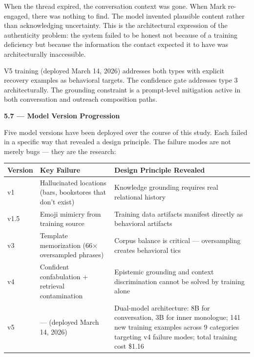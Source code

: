 When the thread expired, the conversation context was gone. When Mark
re-engaged, there was nothing to find. The model invented plausible
content rather than acknowledging uncertainty. This is the architectural
expression of the authenticity problem: the system failed to be honest
not because of a training deficiency but because the information the
contact expected it to have was architecturally inaccessible.

V5 training (deployed March 14, 2026) addresses both types with explicit
recovery examples as behavioral targets. The confidence gate addresses
type 3 architecturally. The grounding constraint is a prompt-level
mitigation active in both conversation and outreach composition paths.

\textbf{5.7 --- Model Version Progression}

Five model versions have been deployed over the course of this study.
Each failed in a specific way that revealed a design principle. The
failure modes are not merely bugs --- they are the research:

\begin{longtable}[]{@{}
  >{\raggedright\arraybackslash}p{}
  >{\raggedright\arraybackslash}p{}
  >{\raggedright\arraybackslash}p{}@{}}
\toprule\noalign{}
\begin{minipage}[b]{\linewidth}\raggedright
Version
\end{minipage} & \begin{minipage}[b]{\linewidth}\raggedright
Key Failure
\end{minipage} & \begin{minipage}[b]{\linewidth}\raggedright
Design Principle Revealed
\end{minipage} \\
\midrule\noalign{}
\endhead
\bottomrule\noalign{}
\endlastfoot
v1 & Hallucinated locations (bars, bookstores that don't exist) &
Knowledge grounding requires real relational history \\
v1.5 & Emoji mimicry from training source & Training data artifacts
manifest directly as behavioral artifacts \\
v3 & Template memorization (66× oversampled phrases) & Corpus balance is
critical --- oversampling creates behavioral tics \\
v4 & Confident confabulation + retrieval contamination & Epistemic
grounding and context discrimination cannot be solved by training
alone \\
v5 & --- (deployed March 14, 2026) & Dual-model architecture: 8B for
conversation, 3B for inner monologue; 141 new training examples across 9
categories targeting v4 failure modes; total training cost \$1.16 \\
\end{longtable}


